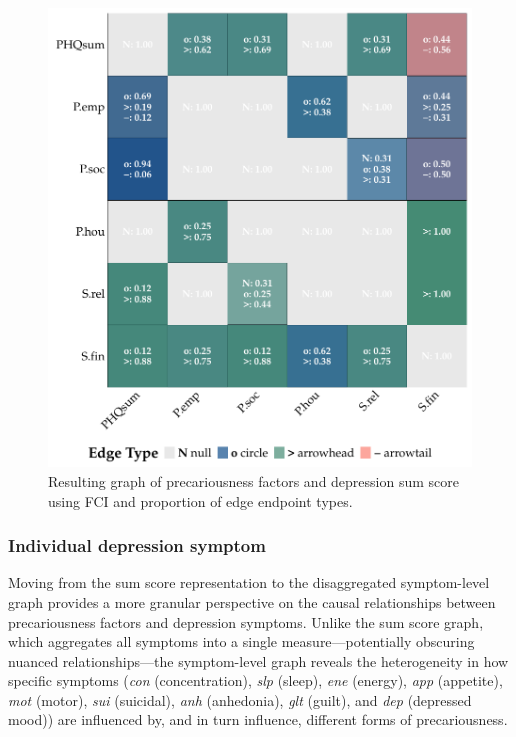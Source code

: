 \documentclass[
]{article}
\begin{document}
\begin{figure}
\begin{minipage}{0.50\linewidth}
{\includegraphics[width=1\textwidth,height=\textheight]{img/depsum_mat_fci.pdf}

}


\end{minipage}%

\caption{\label{fig-sum}Resulting graph of precariousness factors and
depression sum score using FCI and proportion of edge endpoint types.}

\end{figure}%

\subsubsection{Individual depression
symptom}\label{individual-depression-symptom}

Moving from the sum score representation to the disaggregated
symptom-level graph provides a more granular perspective on the causal
relationships between precariousness factors and depression symptoms.
Unlike the sum score graph, which aggregates all symptoms into a single
measure---potentially obscuring nuanced relationships---the
symptom-level graph reveals the heterogeneity in how specific symptoms
(\emph{con} (concentration), \emph{slp} (sleep), \emph{ene} (energy),
\emph{app} (appetite), \emph{mot} (motor), \emph{sui} (suicidal),
\emph{anh} (anhedonia), \emph{glt} (guilt), and \emph{dep} (depressed
mood)) are influenced by, and in turn influence, different forms of
precariousness.
\end{document}
